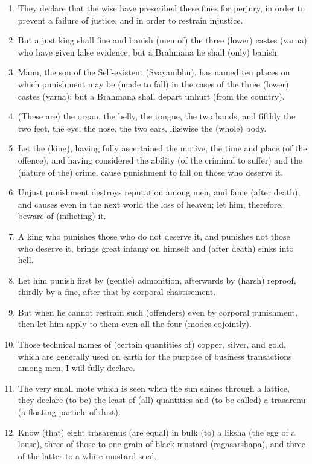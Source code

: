 \begin{enumerate}
\item They declare that the wise have prescribed these fines for perjury, in order to prevent a failure of justice, and in order to restrain injustice.
\item But a just king shall fine and banish (men of) the three (lower) castes (varna) who have given false evidence, but a Brahmana he shall (only) banish.
\item Manu, the son of the Self-existent (Svayambhu), has named ten places on which punishment may be (made to fall) in the cases of the three (lower) castes (varna); but a Brahmana shall depart unhurt (from the country).
\item (These are) the organ, the belly, the tongue, the two hands, and fifthly the two feet, the eye, the nose, the two ears, likewise the (whole) body.
\item Let the (king), having fully ascertained the motive, the time and place (of the offence), and having considered the ability (of the criminal to suffer) and the (nature of the) crime, cause punishment to fall on those who deserve it.
\item Unjust punishment destroys reputation among men, and fame (after death), and causes even in the next world the loss of heaven; let him, therefore, beware of (inflicting) it.
\item A king who punishes those who do not deserve it, and punishes not those who deserve it, brings great infamy on himself and (after death) sinks into hell.
\item Let him punish first by (gentle) admonition, afterwards by (harsh) reproof, thirdly by a fine, after that by corporal chastisement.
\item But when he cannot restrain such (offenders) even by corporal punishment, then let him apply to them even all the four (modes cojointly).
\item Those technical names of (certain quantities of) copper, silver, and gold, which are generally used on earth for the purpose of business transactions among men, I will fully declare.
\item The very small mote which is seen when the sun shines through a lattice, they declare (to be) the least of (all) quantities and (to be called) a trasarenu (a floating particle of dust).
\item Know (that) eight trasarenus (are equal) in bulk (to) a liksha (the egg of a louse), three of those to one grain of black mustard (ragasarshapa), and three of the latter to a white mustard-seed.

\end{enumerate}
